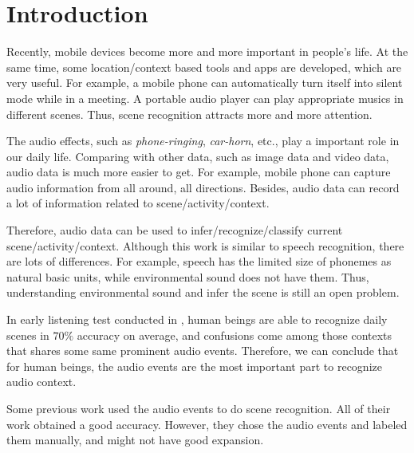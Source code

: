 \chapter{Introduction}

Recently, mobile devices become more and more important in people's life. At the same time, some location/context based tools and apps are developed, which are very useful. For example, a mobile phone can automatically turn itself into silent mode while in a meeting. A portable audio player can play appropriate musics in different scenes. Thus, scene recognition attracts more and more attention.

The audio effects, such as {\em phone-ringing}, {\em car-horn}, etc., play a important role in our daily life. Comparing with other data, such as image data and video data, audio data is much more easier to get. For example, mobile phone can capture audio information from all around, all directions. Besides, audio data can record a lot of information related to scene/activity/context.

Therefore, audio data can be used to infer/recognize/classify current scene/activity/context. Although this work is similar to speech recognition, there are lots of differences. For example, speech has the limited size of phonemes as natural basic units, while environmental sound does not have them. Thus, understanding environmental sound and infer the scene is still an open problem.

In early listening test conducted in \cite{peltonen2001recognition}, human beings are able to recognize daily scenes in $70\%$ accuracy on average, and confusions come among those contexts that shares some same prominent audio events. Therefore, we can conclude that for human beings, the audio events are the most important part to recognize audio context.

Some previous work \cite{1621215, heittola2010audio} used the audio events to do scene recognition. All of their work obtained a good accuracy. However, they chose the audio events and labeled them manually, and might not have good expansion.

